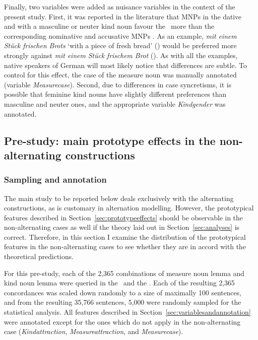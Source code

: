 Finally, two variables were added as nuisance variables in the context of the present study.
First, it was reported in the literature that MNPs in the dative and with a masculine or neuter kind noun favour the \PGCa\ more than the corresponding nominative and accusative MNPs \citep{Hentschel1993,Zimmer2015}.
As an example, \textit{mit einem Stück frischen Brots} `with a piece of fresh bread' (\PGCa) would be preferred more strongly against \textit{mit einem Stück frischem Brot} (\NACa).
As with all the examples, native speakers of German will most likely notice that differences are subtle.
To control for this effect, the case of the measure noun was manually annotated (variable \textit{Measurecase}).
Second, due to differences in case syncretisms, it is possible that feminine kind nouns have slightly different preferences than masculine and neuter ones, and the appropriate variable \textit{Kindgender} was annotated.

\subsection{Pre-study: main prototype effects in the non-alternating constructions}
\label{sec:prestudy}

\subsubsection{Sampling and annotation}

The main study to be reported below deals exclusively with the alternating constructions, as is customary in alternation modelling.
However, the prototypical features described in Section~\ref{sec:prototypeeffects} should be observable in the non-alternating cases as well if the theory laid out in Section~\ref{sec:analyses} is correct.
Therefore, in this section I examine the distribution of the prototypical features in the non-alternating cases to see whether they are in accord with the theoretical predictions.

For this pre-study, each of the 2,365 combinations of measure noun lemma and kind noun lemma were queried in the \NACb\ and the \PGCd.
Each of the resulting 2,365 concordances was scaled down randomly to a size of maximally 100 sentences, and from the resulting 35,766 sentences, 5,000 were randomly sampled for the statistical analysis.
All features described in Section~\ref{sec:variablesandannotation} were annotated except for the ones which do not apply in the non-alternating case (\textit{Kindattraction}, \textit{Measureattraction}, and \textit{Measurecase}).

